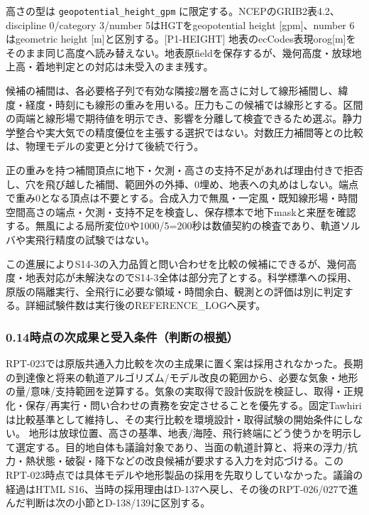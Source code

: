 \documentclass[11pt,a4paper]{article}
\begin{document}
高さの型は \texttt{geopotential\_height\_gpm}
に限定する。NCEPのGRIB2表4.2、discipline 0/category 3/number
5はHGTをgeopotential height {[}gpm{]}、number 6はgeometric height
{[}m{]}と区別する。{[}P1-HEIGHT{]}
地表のecCodes表現orog{[}m{]}をそのまま同じ高度へ読み替えない。地表原fieldを保存するが、幾何高度・放球地上高・着地判定との対応は未受入のまま残す。

候補の補間は、各必要格子列で有効な隣接2層を高さに対して線形補間し、緯度・経度・時刻にも線形の重みを用いる。圧力もこの候補では線形とする。区間の両端と線形場で期待値を明示でき、影響を分離して検査できるため選ぶ。静力学整合や実大気での精度優位を主張する選択ではない。対数圧力補間等との比較は、物理モデルの変更と分けて後続で行う。

正の重みを持つ補間頂点に地下・欠測・高さの支持不足があれば理由付きで拒否し、穴を飛び越した補間、範囲外の外挿、0埋め、地表への丸めはしない。端点で重み0となる頂点は不要とする。合成入力で無風・一定風・既知線形場・時間空間高さの端点・欠測・支持不足を検査し、保存標本で地下maskと来歴を確認する。無風による局所変位0や1000/5=200秒は数値契約の検査であり、軌道ソルバや実飛行精度の試験ではない。

この進展によりS14-3の入力品質と問い合わせを比較の候補にできるが、幾何高度・地表対応が未解決なのでS14-3全体は部分完了とする。科学標準への採用、原版の隔離実行、全飛行に必要な領域・時間余白、観測との評価は別に判定する。詳細試験件数は実行後のREFERENCE\_LOGへ戻す。

\subsubsection{0.14時点の次成果と受入条件（判断の根拠）}\label{ux6642ux70b9ux306eux6b21ux6210ux679cux3068ux53d7ux5165ux6761ux4ef6ux5224ux65adux306eux6839ux62e0}

RPT-023では原版共通入力比較を次の主成果に置く案は採用されなかった。長期の到達像と将来の軌道アルゴリズム/モデル改良の範囲から、必要な気象・地形の量/意味/支持範囲を逆算する。気象の実取得で設計仮説を検証し、取得・正規化・保存/再実行・問い合わせの責務を安定させることを優先する。固定Tawhiriは比較基準として維持し、その実行比較を環境設計・取得試験の開始条件にしない。
地形は放球位置、高さの基準、地表/海陸、飛行終端にどう使うかを明示して選定する。目的地自体も議論対象であり、当面の軌道計算と、将来の浮力/抗力・熱状態・破裂・降下などの改良候補が要求する入力を対応づける。このRPT-023時点では具体モデルや地形製品の採用を先取りしていなかった。議論の経過はHTML
S16、当時の採用理由はD-137へ戻し、その後のRPT-026/027で進んだ判断は次の小節とD-138/139に区別する。
\end{document}
